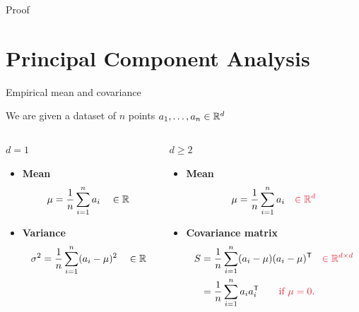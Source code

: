 \documentclass{beamer}
\begin{document}
\begin{frame}[t]{Proof}
	\grid

	\pause
\end{frame}

\section{Principal Component Analysis}
\begin{frame}[t]{Empirical mean and covariance}
	\grid

	We are given a dataset of $n$ points $a_1, \dots, a_n \in \mathbb{R}^d$
	\vspace*{0.4cm}
	\begin{columns}
		\hspace*{-0.6cm}
		\begin{column}{0.45\textwidth}
			\vspace*{-1.7cm}
			\begin{center}
				\underline{$d=1$}
			\end{center}

			\begin{itemize}
				\item \textbf{Mean}
					$$
					\mu = \frac{1}{n}\sum_{i=1}^n a_i \quad \in \mathbb{R}
					$$
				\item \textbf{Variance}
					$$
					\sigma^2 = \frac{1}{n} \sum_{i=1}^n (a_i - \mu)^2 \quad \in \mathbb{R}
					$$
			\end{itemize}
		\end{column}
		\vrule
		\begin{column}{0.5\textwidth}
			\vspace*{-0.5cm}
			\pause
			\begin{center}
				\underline{$d \geq 2$}
			\end{center}
			\begin{itemize}
				\item \textbf{Mean}
					$$
					\mu = \frac{1}{n}\sum_{i=1}^n a_i \quad {\color{ExecusharesRed} \in \R^d}
					$$
				\item \textbf{Covariance matrix}
					\begin{align*}
						S &= \frac{1}{n} \sum_{i=1}^n (a_i - \mu)(a_i - \mu)^{\sT} \quad {\color{ExecusharesRed} \in \R^{d \times d}}
						\\
						  &= \frac{1}{n} \sum_{i=1}^n a_i a_i ^{\sT} \qquad {\color{ExecusharesRed} \text{if  } \mu=0.}
					\end{align*}
			\end{itemize}
		\end{column}
	\end{columns}
\end{frame}
\end{document}
